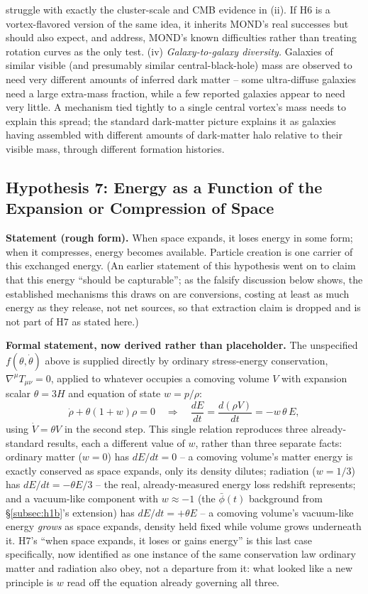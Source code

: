 \documentclass[12pt, a4paper]{article}
\begin{document}
struggle with exactly the cluster-scale and CMB evidence in (ii). If
H6 is a vortex-flavored version of the same idea, it inherits MOND's
real successes but should also expect, and address, MOND's known
difficulties rather than treating rotation curves as the only test.
(iv) \emph{Galaxy-to-galaxy diversity.} Galaxies of similar visible
(and presumably similar central-black-hole) mass are observed to
need very different amounts of inferred dark matter -- some
ultra-diffuse galaxies need a large extra-mass fraction, while a few
reported galaxies appear to need very little. A mechanism tied
tightly to a single central vortex's mass needs to explain this
spread; the standard dark-matter picture explains it as galaxies
having assembled with different amounts of dark-matter halo relative
to their visible mass, through different formation histories.

\subsection{Hypothesis 7: Energy as a Function of the Expansion or Compression of Space}
\label{subsec:h7}
\textbf{Statement (rough form).} When space expands, it loses energy
in some form; when it compresses, energy becomes available. Particle
creation is one carrier of this exchanged energy. (An earlier
statement of this hypothesis went on to claim that this energy
``should be capturable''; as the falsify discussion below shows, the
established mechanisms this draws on are conversions, costing at
least as much energy as they release, not net sources, so that
extraction claim is dropped and is not part of H7 as stated here.)

\textbf{Formal statement, now derived rather than placeholder.} The
unspecified $f(\theta,\dot\theta)$ above is supplied directly by
ordinary stress-energy conservation, $\nabla^\mu T_{\mu\nu}=0$,
applied to whatever occupies a comoving volume $V$ with expansion
scalar $\theta=3H$ and equation of state $w=p/\rho$:
\begin{equation}
\dot\rho + \theta(1+w)\rho = 0
\quad\Longrightarrow\quad
\frac{dE}{dt} = \frac{d(\rho V)}{dt} = -w\,\theta\,E,
\end{equation}
using $\dot V=\theta V$ in the second step. This single relation
reproduces three already-standard results, each a different value of
$w$, rather than three separate facts: ordinary matter ($w=0$) has
$dE/dt=0$ -- a comoving volume's matter energy is exactly conserved
as space expands, only its density dilutes; radiation ($w=1/3$) has
$dE/dt=-\theta E/3$ -- the real, already-measured energy loss
redshift represents; and a vacuum-like component with $w\approx-1$
(the $\bar\phi(t)$ background from \S\ref{subsec:h1b}'s extension) has
$dE/dt=+\theta E$ -- a comoving volume's vacuum-like energy
\emph{grows} as space expands, density held fixed while volume grows
underneath it. H7's ``when space expands, it loses or gains energy''
is this last case specifically, now identified as one instance of
the same conservation law ordinary matter and radiation also obey,
not a departure from it: what looked like a new principle is $w$ read
off the equation already governing all three.
\end{document}
